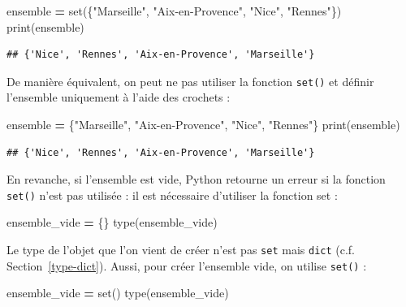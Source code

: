 \documentclass[12pt,]{book}
\newenvironment{Shaded}{\begin{snugshade}}{\end{snugshade}}
\newcommand{\StringTok}[1]{\textcolor[rgb]{0.31,0.60,0.02}{#1}}
\newcommand{\OperatorTok}[1]{\textcolor[rgb]{0.81,0.36,0.00}{\textbf{#1}}}
\newcommand{\BuiltInTok}[1]{#1}
\newcommand{\NormalTok}[1]{#1}
\numberwithin{equation}{section}
\numberwithin{countremarque}{section}
\begin{document}
\begin{Shaded}
\begin{Highlighting}[]
\NormalTok{ensemble }\OperatorTok{=} \BuiltInTok{set}\NormalTok{(\{}\StringTok{"Marseille"}\NormalTok{, }\StringTok{"Aix-en-Provence"}\NormalTok{, }\StringTok{"Nice"}\NormalTok{, }\StringTok{"Rennes"}\NormalTok{\})}
\BuiltInTok{print}\NormalTok{(ensemble)}
\end{Highlighting}
\end{Shaded}

\begin{lstlisting}
## {'Nice', 'Rennes', 'Aix-en-Provence', 'Marseille'}
\end{lstlisting}

De manière équivalent, on peut ne pas utiliser la fonction
\texttt{set()} et définir l'ensemble uniquement à l'aide des crochets :

\begin{Shaded}
\begin{Highlighting}[]
\NormalTok{ensemble }\OperatorTok{=}\NormalTok{ \{}\StringTok{"Marseille"}\NormalTok{, }\StringTok{"Aix-en-Provence"}\NormalTok{, }\StringTok{"Nice"}\NormalTok{, }\StringTok{"Rennes"}\NormalTok{\}}
\BuiltInTok{print}\NormalTok{(ensemble)}
\end{Highlighting}
\end{Shaded}

\begin{lstlisting}
## {'Nice', 'Rennes', 'Aix-en-Provence', 'Marseille'}
\end{lstlisting}

En revanche, si l'ensemble est vide, Python retourne un erreur si la
fonction \texttt{set()} n'est pas utilisée : il est nécessaire
d'utiliser la fonction set :

\begin{Shaded}
\begin{Highlighting}[]
\NormalTok{ensemble_vide }\OperatorTok{=}\NormalTok{ \{\}}
\BuiltInTok{type}\NormalTok{(ensemble_vide)}
\end{Highlighting}
\end{Shaded}

Le type de l'objet que l'on vient de créer n'est pas \texttt{set} mais
\texttt{dict} (c.f. Section~\ref{type-dict}). Aussi, pour créer
l'ensemble vide, on utilise \texttt{set()} :

\begin{Shaded}
\begin{Highlighting}[]
\NormalTok{ensemble_vide }\OperatorTok{=} \BuiltInTok{set}\NormalTok{()}
\BuiltInTok{type}\NormalTok{(ensemble_vide)}
\end{Highlighting}
\end{Shaded}
\end{document}
